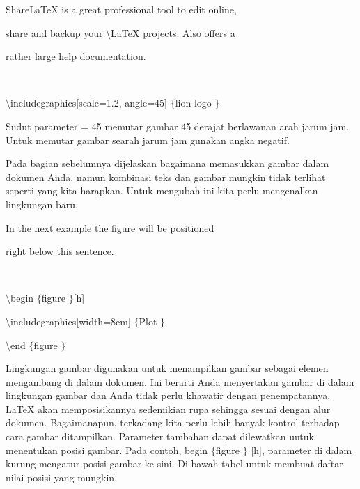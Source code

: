 ShareLaTeX is a great professional tool to edit online, \par
\noindent 
  \par
\noindent 
share and backup your  $  \setminus $LaTeX projects. Also offers a  \par
\vspace{12pt}
\noindent 
rather large help documentation. \par
\noindent 
 $  $ \par
\noindent 
 $  \setminus $includegraphics[scale=1.2, angle=45] $  \{  $lion-logo $  \}  $ \par
\vspace{12pt}
\vspace{12pt}
\noindent 
Sudut parameter = 45 memutar gambar 45 derajat berlawanan arah jarum jam. Untuk memutar gambar searah jarum jam gunakan angka negatif. \par
\vspace{16pt}
\noindent 
 \hspace*{0.5in} Pada bagian sebelumnya dijelaskan bagaimana memasukkan gambar dalam dokumen Anda, namun kombinasi teks dan gambar mungkin tidak terlihat seperti yang kita harapkan. Untuk mengubah ini kita perlu mengenalkan lingkungan baru. \par
\vspace{12pt}
\noindent 
{\fontsize{14pt}{14pt}\selectfont In the next example the figure will be positioned  \\} \par
\vspace{14pt}
\noindent 
{\fontsize{14pt}{14pt}\selectfont right below this sentence. \\} \par
\noindent 
{\fontsize{14pt}{14pt}\selectfont  $  $ \\} \par
\noindent 
{\fontsize{14pt}{14pt}\selectfont  $  \setminus $begin $  \{  $figure $  \}  $[h] \\} \par
\vspace{14pt}
\noindent 
{\fontsize{14pt}{14pt}\selectfont  $  \setminus $includegraphics[width=8cm] $  \{  $Plot $  \}  $ \\} \par
\vspace{14pt}
\noindent 
{\fontsize{14pt}{14pt}\selectfont  $  \setminus $end $  \{  $figure $  \}  $ \\} \par
\noindent 
 \hspace*{0.5in} Lingkungan gambar digunakan untuk menampilkan gambar sebagai elemen mengambang di dalam dokumen. Ini berarti Anda menyertakan gambar di dalam lingkungan gambar dan Anda tidak perlu khawatir dengan penempatannya, LaTeX akan memposisikannya sedemikian rupa sehingga sesuai dengan alur dokumen. Bagaimanapun, terkadang kita perlu lebih banyak kontrol terhadap cara gambar ditampilkan. Parameter tambahan dapat dilewatkan untuk menentukan posisi gambar. Pada contoh, begin  $  \{  $figure $  \}  $ [h], parameter di dalam kurung mengatur posisi gambar ke sini. Di bawah tabel untuk membuat daftar nilai posisi yang mungkin. \par
